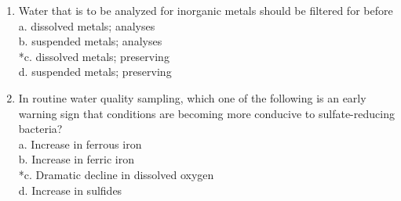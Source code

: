 \begin{enumerate}[1.]
\item Water that is to be analyzed for inorganic metals should be filtered for before\\
a. dissolved metals; analyses\\
b. suspended metals; analyses\\
*c. dissolved metals; preserving\\
d. suspended metals; preserving\\
  \item In routine water quality sampling, which one of the following is an early warning sign that conditions are becoming more conducive to sulfate-reducing bacteria?\\
a. Increase in ferrous iron\\
b. Increase in ferric iron\\
*c. Dramatic decline in dissolved oxygen\\
d. Increase in sulfides 


\end{enumerate}
